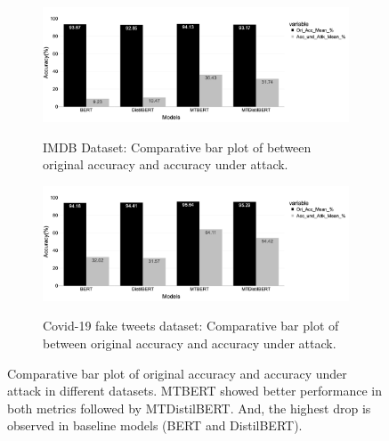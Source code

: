 \documentclass[%
	BCOR=8mm, %
	DIV=12,
	toc=bibliography, %
	toc=listof, %
	oneside, %
	egregdoesnotlikesansseriftitles, %
	]{scrbook}
\begin{document}
\begin{figure}[H]
    \centering
    \hspace*{2.9em}
    \begin{subfigure}
            \centering
            \includegraphics[width=.90\linewidth]{img/MOAandAUA_Imdb.png}
            \caption{IMDB Dataset: Comparative bar plot of between original accuracy and accuracy under attack.}{}
               \label{fig:}
        \end{subfigure}
    \begin{subfigure}
            \centering
            \hspace*{2.9em}
            \includegraphics[width=.90\linewidth]{img/MOAandAUA_fknews}
            \caption{Covid-19 fake tweets dataset: Comparative bar plot of between original accuracy and accuracy under attack.}{}
              \label{fig:sub2}
        \end{subfigure}
 \caption[Comparative bar plot between original accuracy and accuracy under attack]{\small Comparative bar plot of original accuracy and accuracy under attack in different datasets. MTBERT showed better performance in both metrics followed by MTDistilBERT. And, the highest drop is observed in baseline models (BERT and DistilBERT).}
  \label{fig:moaandauaimdb}
\end{figure}
\end{document}
